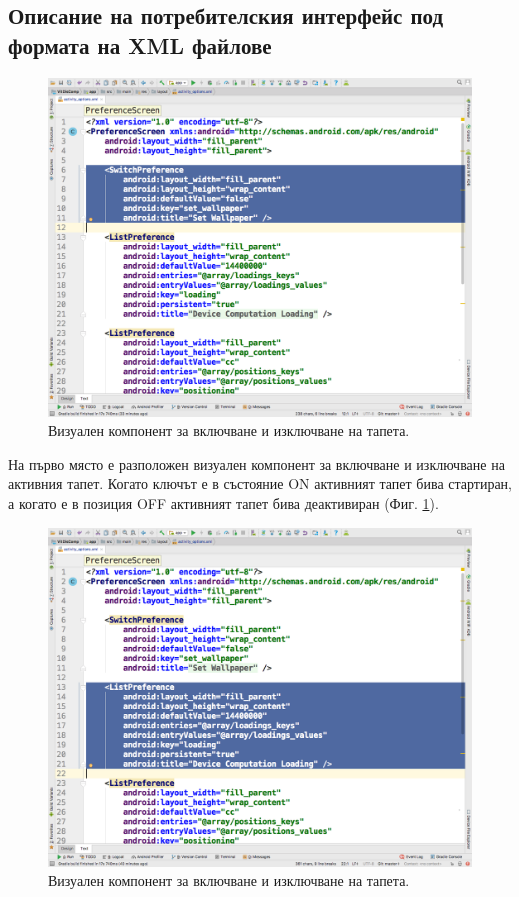 \documentclass[book,14pt,oneside,openany]{memoir}
\begin{document}
\subsection{Описание на потребителския интерфейс под формата на XML файлове}

\begin{figure}[h]
  \centering
  \includegraphics[height=0.45\pdfpageheight]{pic0021}
  \caption{Визуален компонент за включване и изключване на тапета.}
\label{fig:pic0021}
\end{figure}
\FloatBarrier

На първо място е разположен визуален компонент за включване и изключване на активния тапет. Когато ключът е в състояние ON активният тапет бива стартиран, а когато е в позиция OFF активният тапет бива деактивиран (Фиг. \ref{fig:pic0021}). 

\begin{figure}[h]
  \centering
  \includegraphics[height=0.45\pdfpageheight]{pic0022}
  \caption{Визуален компонент за включване и изключване на тапета.}
\label{fig:pic0022}
\end{figure}
\FloatBarrier
\end{document}
